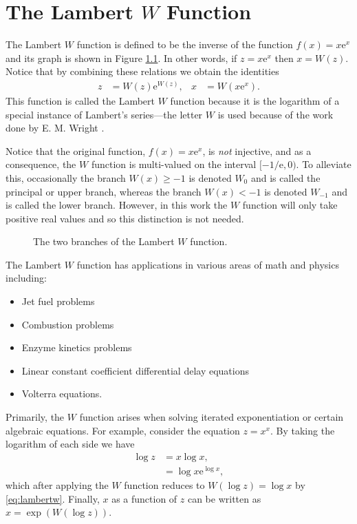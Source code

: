 
\chapter{The Lambert $W$ Function}
\label{chap:lambertw}
The Lambert $W$ function is defined to be the inverse of the function $f(x) = x \textrm{e}^x$ and its graph is shown in Figure \ref{fig:lambertw}. In other words, if $z = x \textrm{e}^x$ then $x = W(z)$. Notice that by combining these relations we obtain the identities
\begin{align}
\label{eq:lambertw}
z &= W(z) \textrm{e}^{W(z)}, & x &= W(x \textrm{e}^x).
\end{align}
This function is called the Lambert $W$ function because it is the logarithm of a special instance of Lambert's series---the letter $W$ is used because of the work done by E. M. Wright \cite{lambertw}.

Notice that the original function, $f(x) = x \textrm{e}^x$, is \emph{not} injective, and as a consequence, the $W$ function is multi-valued on the interval $[-1/\textrm{e},0)$. To alleviate this, occasionally the branch $W(x) \geq -1$ is denoted $W_0$ and is called the principal or upper branch, whereas the branch $W(x) < -1$ is denoted $W_{-1}$ and is called the lower branch. However, in this work the $W$ function will only take positive real values and so this distinction is not needed.

\begin{figure}[htbp]
\centering

\caption{The two branches of the Lambert $W$ function.}
\label{fig:lambertw}
\end{figure}

The Lambert $W$ function has applications in various areas of math and physics \cite{lambertw} including:
\begin{itemize}
\item Jet fuel problems
\item Combustion problems
\item Enzyme kinetics problems
\item Linear constant coefficient differential delay equations
\item Volterra equations.
\end{itemize}
Primarily, the $W$ function arises when solving iterated exponentiation or certain algebraic equations. For example, consider the equation $z = x^x$. By taking the logarithm of each side we have
\begin{align*}
\log z &= x \log x, \\
&= \log x \textrm{e}^{\log x},
\end{align*}
which after applying the $W$ function reduces to $W(\log z) = \log x$ by \eqref{eq:lambertw}. Finally, $x$ as a function of $z$ can be written as $x = \exp(W(\log z))$.

